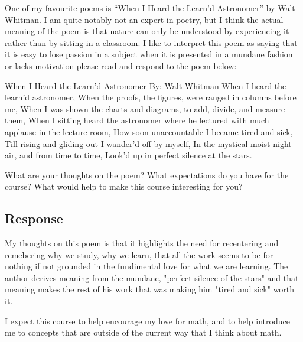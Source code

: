 \documentclass{article}
\begin{document}
One of my favourite poems is “When I Heard the Learn’d Astronomer” by Walt Whitman.
I am quite notably not an expert in poetry, but I think the actual meaning of the poem is
that nature can only be understood by experiencing it rather than by sitting in a classroom.
I like to interpret this poem as saying that it is easy to lose passion in a subject when it
is presented in a mundane fashion or lacks motivation
\newline
please read and respond to the poem below:
\begin{center}
    When I Heard the Learn’d Astronomer
    \newline
    By: Walt Whitman
    \newline 
    \newline
    When I heard the learn’d astronomer,
    \newline
    When the proofs, the figures, were ranged in columns before me,
    \newline
    When I was shown the charts and diagrams, to add, divide, and measure them,
    \newline
    When I sitting heard the astronomer where he lectured with much applause in the
    lecture-room,
    \newline
    How soon unaccountable I became tired and sick,
    \newline
    Till rising and gliding out I wander’d off by myself,
    \newline
    In the mystical moist night-air, and from time to time,
    \newline
    Look’d up in perfect silence at the stars.

\end{center}

What are your thoughts on the poem? What expectations do you have for the course?
What would help to make this course interesting for you?
\subsection{Response}
My thoughts on this poem is that it highlights the need for recentering and remebering why
we study, why we learn, that all the work seems to be for nothing if not grounded in the fundimental
love for what we are learning. The author derives meaning from the mundane, "perfect silence of the stars" 
and that meaning makes the rest of his work that was making him "tired and sick" worth it.
\newline

I expect this course to help encourage my love for math, and to help introduce me to concepts that are outside 
of the current way that I think about math. 
\newline 
\end{document}

